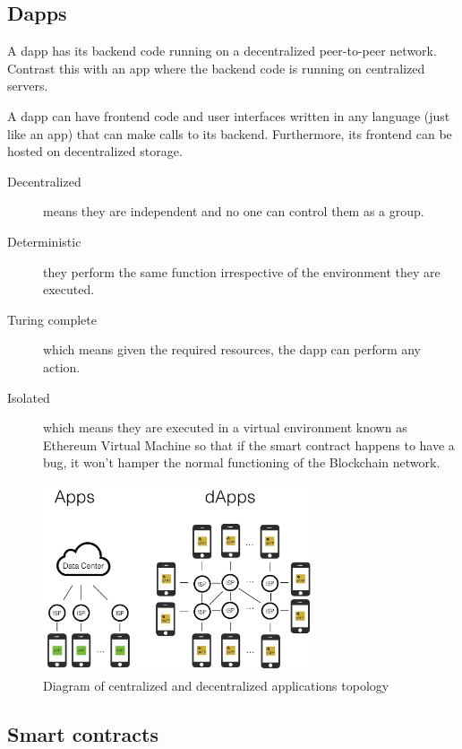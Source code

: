 \subsection{Dapps}

A dapp has its \gls{backend} code running on a decentralized peer-to-peer network. Contrast this with an app where the backend code is running on centralized servers.

A dapp can have frontend code and user interfaces written in any language (just like an app) that can make calls to its backend. Furthermore, its frontend can be hosted on decentralized storage.\cite{ethereumcommunityEthereumDevelopmentDocumentation}

\begin{description}
\item[Decentralized] means they are independent and no one can control them as a group.
\item[Deterministic] they perform the same function irrespective of the environment they are executed.
\item[Turing complete] which means given the required resources, the dapp can perform any action.
\item[Isolated] which means they are executed in a virtual environment known as Ethereum Virtual Machine so that if the smart contract happens to have a bug, it won’t hamper the normal functioning of the Blockchain network.
\end{description}

\begin{figure}[H]
	\centering
		\includegraphics[width=8cm]{images/chapter2/dapps.png}
		\caption{{\footnotesize Diagram of centralized and decentralized applications topology}}
\end{figure}

\subsection{Smart contracts}

